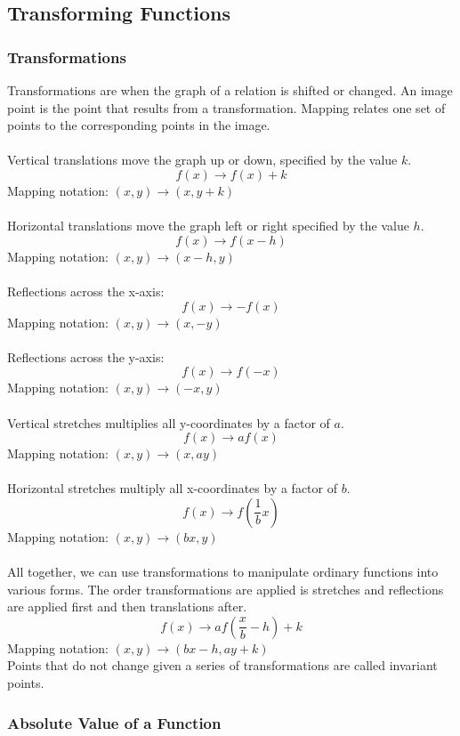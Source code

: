 \documentclass[11pt, fleqn]{article}
\begin{document}
\subsection{Transforming Functions}

\subsubsection{Transformations}
Transformations are when the graph of a relation is shifted or changed. An image point is the point that results from a transformation. Mapping relates one set of points to the corresponding points in the image.\\
\\
Vertical translations move the graph up or down, specified by the value $k$.
$$f(x)\rightarrow f(x)+k$$
Mapping notation: $(x,y)\rightarrow(x,y+k)$\\
\\
Horizontal translations move the graph left or right specified by the value $h$.
$$f(x)\rightarrow f(x-h)$$
Mapping notation: $(x,y)\rightarrow(x-h,y)$\\
\\
Reflections across the x-axis:
$$f(x)\rightarrow -f(x)$$
Mapping notation: $(x,y)\rightarrow (x,-y)$\\
\\
Reflections across the y-axis:
$$f(x)\rightarrow f(-x)$$
Mapping notation: $(x,y)\rightarrow(-x,y)$\\
\\
Vertical stretches multiplies all y-coordinates by a factor of $a$.
$$f(x)\rightarrow af(x)$$
Mapping notation: $(x,y)\rightarrow (x,ay)$\\
\\
Horizontal stretches multiply all x-coordinates by a factor of $b$.
$$f(x)\rightarrow f\left(\frac{1}{b}x\right)$$
Mapping notation: $(x,y)\rightarrow(bx,y)$\\
\\
All together, we can use transformations to manipulate ordinary functions into various forms. The order transformations are applied is stretches and reflections are applied first and then translations after.
$$f(x)\rightarrow af\left(\frac{x}{b}-h\right)+k$$
Mapping notation: $(x,y)\rightarrow (bx-h,ay+k)$\\
Points that do not change given a series of transformations are called invariant points.

\subsubsection{Absolute Value of a Function}
\end{document}
